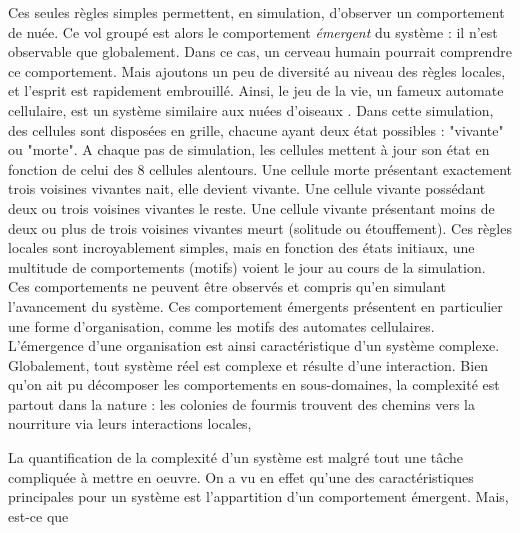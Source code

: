Ces seules règles simples permettent, en simulation, d'observer un comportement de nuée. Ce vol groupé est alors le comportement \emph{émergent} du système : il n'est observable que globalement. Dans ce cas, un cerveau humain pourrait comprendre ce comportement. Mais ajoutons un peu de diversité au niveau des règles locales, et l'esprit est rapidement embrouillé. Ainsi, le jeu de la vie, un fameux automate cellulaire, est un système similaire aux nuées d'oiseaux . Dans cette simulation, des cellules sont disposées en grille, chacune ayant deux état possibles : "vivante" ou "morte". A chaque pas de simulation, les cellules mettent à jour son état en fonction de celui des 8 cellules alentours. Une cellule morte présentant exactement trois voisines vivantes nait, elle devient vivante. Une cellule vivante possédant deux ou trois voisines vivantes le reste. Une cellule vivante présentant moins de deux ou plus de trois voisines vivantes meurt (solitude ou étouffement). Ces règles locales sont incroyablement simples, mais en fonction des états initiaux, une multitude de comportements (motifs) voient le jour au cours de la simulation. Ces comportements ne peuvent être observés et compris qu'en simulant l'avancement du système.
Ces comportement émergents présentent en particulier une forme d'organisation, comme les motifs des automates cellulaires. L'émergence d'une organisation est ainsi caractéristique d'un système complexe. 
Globalement, tout système réel est complexe et résulte d'une interaction. Bien qu'on ait pu décomposer les comportements en sous-domaines, la complexité est partout dans la nature : les colonies de fourmis trouvent des chemins vers la nourriture via leurs interactions locales,
 
La quantification de la complexité d'un système est malgré tout une tâche compliquée à mettre en oeuvre. On a vu en effet qu'une des caractéristiques principales pour un système est l'appartition d'un comportement émergent. Mais, est-ce que




